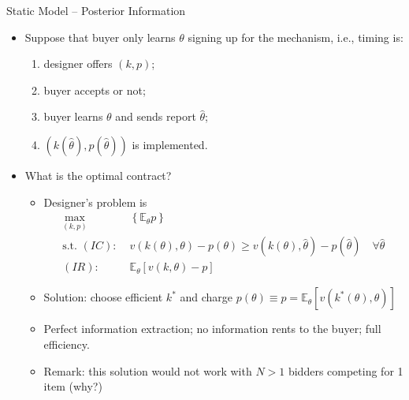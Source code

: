 \documentclass[english,10pt
,aspectratio=169
]{beamer}
\begin{document}
\begin{frame}{Static Model -- Posterior Information}
\begin{example}
	\begin{itemize}
		\item Suppose that buyer only learns $\theta$  signing up for the mechanism, i.e., timing is:
		\begin{enumerate}
			\item designer offers $(k,p)$;
			\item buyer accepts or not;
			\item buyer learns $\theta$ and sends report $\hat{\theta}$;
			\item $(k(\hat{\theta}),p(\hat{\theta}))$ is implemented.
		\end{enumerate}
		\item What is the optimal contract?
		\pause
		\begin{itemize}
			\item Designer's problem is
			\begin{align*}
				\max_{(k,p)} &\;\left\{ \mathbb{E}_\theta p \right\}
				\\
				\text{s.t. } (IC): &\; v(k(\theta),\theta) - p(\theta) \geq v(k(\theta),\hat{\theta}) - p(\hat{\theta}) \quad \forall\hat{\theta}
				\\
				(IR): &\; \mathbb{E}_\theta \left[v(k,\theta) - p\right]
			\end{align*}
			\item Solution: choose efficient $k^*$ and charge $p(\theta) \equiv p = \mathbb{E}_\theta \left[v(k^*(\theta),\theta)\right]$
			\item Perfect information extraction; no information rents to the buyer; full efficiency.
			\item Remark: this solution would not work with $N>1$ bidders competing for 1 item (why?)
		\end{itemize}
	\end{itemize}
\end{example}
\end{frame}
\end{document}
